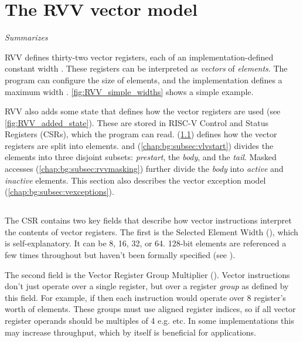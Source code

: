 \section{The RVV vector model}\label{chap:bg:sec:rvv:vector_model}
\emph{Summarizes \cite[Sections 1-6, 17]{specification-RVV-v1.0}}


RVV defines thirty-two vector registers, each of an implementation-defined constant width .
These registers can be interpreted as \emph{vectors} of \emph{elements}.
The program can configure the size of elements, and the implementation defines a maximum width .
\cref{fig:RVV_simple_widths} shows a simple example.

RVV also adds some state that defines how the vector registers are used (see \cref{fig:RVV_added_state}).
These are stored in RISC-V Control and Status Registers (CSRs), which the program can read.
 (\cref{chap:bg:subsec:vtype}) defines how the vector registers are split into elements.
 and  (\cref{chap:bg:subsec:vlvstart}) divides the elements into three disjoint subsets: \emph{prestart}, the \emph{body}, and the \emph{tail}.
Masked accesses (\cref{chap:bg:subsec:rvvmasking}) further divide the \emph{body} into \emph{active} and \emph{inactive} elements.
This section also describes the vector exception model (\cref{chap:bg:subsec:vexceptions}).


\subsection{}\label{chap:bg:subsec:vtype}
The  CSR contains two key fields that describe how vector instructions interpret the contents of vector registers.
The first is the Selected Element Width (), which is self-explanatory.
It can be 8, 16, 32, or 64.
128-bit elements are referenced a few times throughout but haven't been formally specified (see \cite[p10, p32]{specification-RVV-v1.0}).

The second field is the Vector Register Group Multiplier ().
Vector instructions don't just operate over a single register, but over a register \emph{group} as defined by this field.
For example, if  then each instruction would operate over 8 register's worth of elements.
These groups must use aligned register indices, so if  all vector register operands should be multiples of 4 e.g.  etc.
In some implementations this may increase throughput, which by itself is beneficial for applications.

